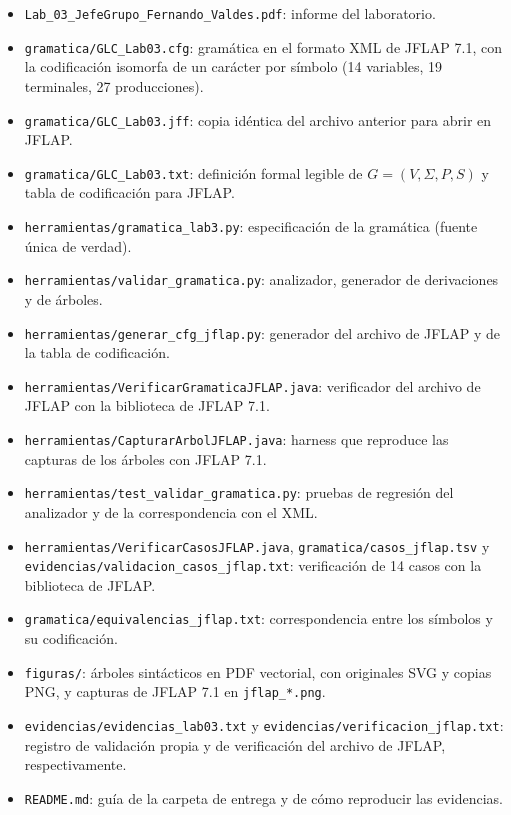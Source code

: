 \documentclass[11pt,letterpaper]{article}
\begin{document}
\begin{itemize}
  \item \texttt{Lab\_03\_JefeGrupo\_Fernando\_Valdes.pdf}: informe del laboratorio.
  \item \texttt{gramatica/\allowbreak GLC\_Lab03.cfg}: gramática en el formato XML de JFLAP 7.1, con
  la codificación isomorfa de un carácter por símbolo (14 variables, 19 terminales, 27 producciones).
  \item \texttt{gramatica/\allowbreak GLC\_Lab03.jff}: copia idéntica del archivo anterior para abrir en JFLAP.
  \item \texttt{gramatica/\allowbreak GLC\_Lab03.txt}: definición formal legible de $G=(V,\Sigma,P,S)$
  y tabla de codificación para JFLAP.
  \item \texttt{herramientas/\allowbreak gramatica\_lab3.py}: especificación de la gramática (fuente única de
  verdad).
  \item \texttt{herramientas/\allowbreak validar\_gramatica.py}: analizador, generador de derivaciones y de
  árboles.
  \item \texttt{herramientas/\allowbreak generar\_cfg\_jflap.py}: generador del archivo de JFLAP y de
  la tabla de codificación.
  \item \texttt{herramientas/\allowbreak VerificarGramaticaJFLAP.\allowbreak java}: verificador del archivo de JFLAP con
  la biblioteca de JFLAP 7.1.
  \item \texttt{herramientas/\allowbreak CapturarArbolJFLAP.\allowbreak java}: harness que reproduce las capturas de los
  árboles con JFLAP 7.1.
  \item \texttt{herramientas/\allowbreak test\_validar\_gramatica.py}: pruebas de regresión del analizador y de la correspondencia con el XML.
  \item \texttt{herramientas/\allowbreak VerificarCasosJFLAP.java},
  \texttt{gramatica/\allowbreak casos\_jflap.tsv} y
  \texttt{evidencias/\allowbreak validacion\_casos\_jflap.txt}: verificación de 14 casos con la biblioteca de JFLAP.
  \item \texttt{gramatica/\allowbreak equivalencias\_jflap.txt}: correspondencia entre los símbolos y su codificación.
  \item \texttt{figuras/}: árboles sintácticos en PDF vectorial, con originales SVG y copias PNG, y
  capturas de JFLAP 7.1 en \texttt{jflap\_*.png}.
  \item \texttt{evidencias/\allowbreak evidencias\_lab03.txt} y \texttt{evidencias/\allowbreak verificacion\_jflap.txt}:
  registro de validación propia y de verificación del archivo de JFLAP, respectivamente.
  \item \texttt{README.md}: guía de la carpeta de entrega y de cómo reproducir las evidencias.
\end{itemize}
\end{document}
